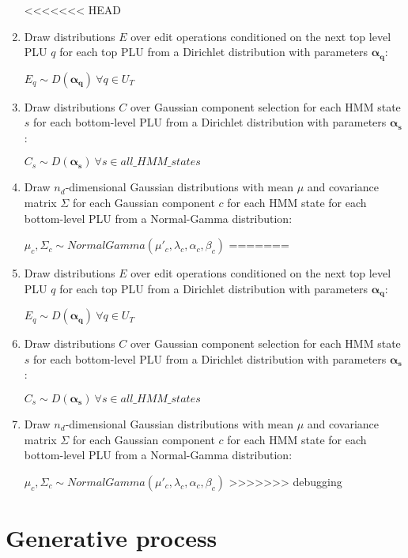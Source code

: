 \documentclass[11pt]{article}
\newcommand{\bs}{\boldsymbol}
\newcommand{\myindent}{\hspace{2cm}}
\begin{document}
\begin{enumerate}

<<<<<<< HEAD
\item Draw distributions $E$ over edit operations conditioned on the
  next top level PLU $q$ for each top PLU from a Dirichlet
  distribution with parameters $\bs{\alpha_q}$:

\myindent $E_q \sim D(\bs{\alpha_{q}}) ~ \forall q \in U_T$

\item Draw distributions $C$ over Gaussian component selection for
  each HMM state $s$ for each bottom-level PLU from a Dirichlet
  distribution with parameters $\bs{\alpha_{s}}$:

\myindent $C_{s} \sim D(\bs{\alpha_{s}}) ~ \forall s \in all\_HMM\_states$

\item Draw $n_d$-dimensional Gaussian distributions with mean $\mu$
  and covariance matrix $\Sigma$ for each Gaussian component $c$ for
  each HMM state for each bottom-level PLU from a Normal-Gamma
  distribution:

  \myindent
  $\mu_c, \Sigma_c \sim NormalGamma(\mu'_c, \lambda_c, \alpha_c,
  \beta_c)$
=======
\item Draw distributions $E$ over edit operations conditioned on the next top level PLU $q$ for each top PLU from a Dirichlet distribution with parameters $\bs{\alpha_q}$:

\myindent $E_q \sim D(\bs{\alpha_{q}}) ~ \forall q \in U_T$

\item Draw distributions $C$ over Gaussian component selection for each HMM state $s$ for each bottom-level PLU from a Dirichlet distribution with parameters $\bs{\alpha_{s}}$:

\myindent $C_{s} \sim D(\bs{\alpha_{s}}) ~ \forall s \in all\_HMM\_states$

\item Draw $n_d$-dimensional Gaussian distributions with mean $\mu$ and covariance matrix $\Sigma$ for each Gaussian component $c$ for each HMM state for each bottom-level PLU from a Normal-Gamma distribution:

\myindent $\mu_c, \Sigma_c \sim NormalGamma(\mu'_c, \lambda_c, \alpha_c, \beta_c)$
>>>>>>> debugging

\end{enumerate}

\section{Generative process}
\end{document}
